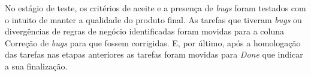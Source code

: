 No estágio de teste, os critérios de aceite e a presença de \textit{bugs} foram testados com o intuito de manter a qualidade do produto final. As tarefas que tiveram \textit{bugs} ou divergências de regras de negócio identificadas foram movidas para a coluna Correção de \textit{bugs} para que fossem corrigidas. E, por último, após a homologação das tarefas nas etapas anteriores as tarefas foram movidas para \textit{Done} que indicar a sua finalização.


